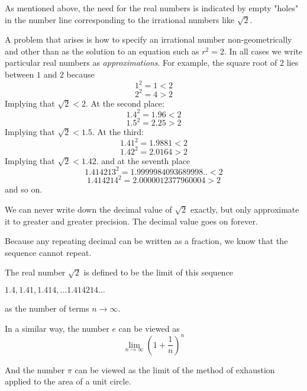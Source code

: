 \documentclass[11pt, oneside]{article}
\begin{document}
As mentioned above, the need for the real numbers is indicated by empty "holes" in the number line corresponding to the irrational numbers like $\sqrt{2}$.

A problem that arises is how to specify an irrational number non-geometrically and other than as the solution to an equation such as $r^2 = 2$.  In all cases we write particular real numbers as \emph{approximations}.  For example, the square root of $2$ lies between $1$ and $2$ because
\[ 1^2 = 1 < 2 \]
\[ 2^2 = 4 > 2 \]
Implying that $\sqrt{2} < 2$.  At the second place:
\[ 1.4^2 = 1.96 < 2 \] 
\[1.5^2 = 2.25 > 2 \]
Implying that $\sqrt{2} < 1.5$.  At the third:
\[ 1.41^2 = 1.9881 < 2 \]
\[1.42^2 = 2.0164 > 2 \]
Implying that $\sqrt{2} < 1.42$.  and at the seventh place
\[ 1.414213^2 = 1.9999984093689998.. < 2 \]
\[ 1.414214^2 = 2.0000012377960004 > 2 \]
and so on.

We can never write down the decimal value of $\sqrt{2}$ exactly, but only approximate it to greater and greater precision.  The decimal value goes on forever.  

Because any repeating decimal can be written as a fraction, we know that the sequence cannot repeat.

The real number $\sqrt{2}$ is defined to be the limit of this sequence 

$1.4, 1.41, 1.414, \dots 1.414214 \dots$ 

as the number of terms $n \rightarrow \infty$.

In a similar way, the number $e$ can be viewed as
\[ \lim_{n \rightarrow \infty} (1 + \frac{1}{n})^n \]

And the number $\pi$ can be viewed as the limit of the method of exhaustion applied to the area of a unit circle.
\end{document}
